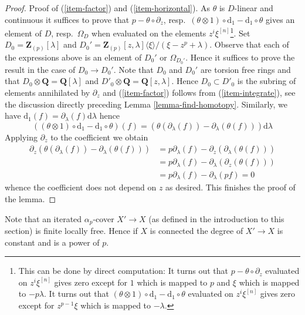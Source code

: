 \begin{proof}
\medskip\noindent
Proof of (\ref{item-factor}) and (\ref{item-horizontal}).
As $\theta$ is $D$-linear and continuous it suffices to prove that
$p - \theta \circ \partial_z$, resp.\ 
$(\theta \otimes 1) \circ \text{d}_1 - \text{d}_1 \circ \theta$
gives an element of $D$, resp.\ $\Omega_D$ when evaluated on the
elements $z^i\xi^{[n]}$\footnote{This can be done by direct computation:
It turns out that $p - \theta \circ \partial_z$ evaluated on
$z^i\xi^{[n]}$ gives zero except for $1$ which is mapped to $p$ and
$\xi$ which is mapped to $-p\lambda$. It turns out that 
$(\theta \otimes 1) \circ \text{d}_1 - \text{d}_1 \circ \theta$
evaluated on $z^i\xi^{[n]}$ gives zero except for $z^{p - 1}\xi$
which is mapped to $-\lambda$.}.
Set $D_0 = \mathbf{Z}_{(p)}[\lambda]$ and
$D_0' = \mathbf{Z}_{(p)}[z, \lambda]\langle \xi \rangle/(\xi - z^p + \lambda)$.
Observe that each of the expressions above is an element of
$D_0'$ or $\Omega_{D_0'}$. Hence it suffices to prove the result
in the case of $D_0 \to D_0'$. Note that $D_0$ and $D_0'$
are torsion free rings and that $D_0 \otimes \mathbf{Q} = \mathbf{Q}[\lambda]$
and $D'_0 \otimes \mathbf{Q} = \mathbf{Q}[z, \lambda]$.
Hence $D_0 \subset D'_0$ is the subring of elements annihilated
by $\partial_z$ and (\ref{item-factor})
follows from (\ref{item-integrate}), see the discussion directly preceding
Lemma \ref{lemma-find-homotopy}. Similarly, we have
$\text{d}_1(f) = \partial_\lambda(f)\text{d}\lambda$ hence
$$
\left((\theta \otimes 1) \circ \text{d}_1 - \text{d}_1 \circ \theta\right)(f)
=
\left(\theta(\partial_\lambda(f)) - \partial_\lambda(\theta(f))\right)
\text{d}\lambda
$$
Applying $\partial_z$ to the coefficient we obtain
\begin{align*}
\partial_z\left(
\theta(\partial_\lambda(f)) - \partial_\lambda(\theta(f))
\right)
& =
p \partial_\lambda(f) - \partial_z(\partial_\lambda(\theta(f))) \\
& =
p \partial_\lambda(f) - \partial_\lambda(\partial_z(\theta(f))) \\
& =
p \partial_\lambda(f) - \partial_\lambda(p f) = 0
\end{align*}
whence the coefficient does not depend on $z$ as desired.
This finishes the proof of the lemma.
\end{proof}

\noindent
Note that an iterated $\alpha_p$-cover $X' \to X$ (as defined in the
introduction to this section) is finite locally free. Hence if $X$ is
connected the degree of $X' \to X$ is constant and is a power of $p$.

